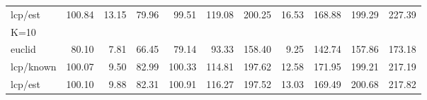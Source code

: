 \documentclass[12pt]{article}
\begin{document}
\begin{table}[ht]
{\begin{tabular}{l|rrrrr|rrrrr}
lcp/est  & 100.84 &13.15 &79.96  &99.51 &119.08  &200.25 &16.53 &168.88 &199.29 &227.39\\
K=10     &        &      &       &      &        &       &      &       &       &       \\
euclid   &  80.10 & 7.81 &66.45  &79.14 &93.33   &158.40 & 9.25 &142.74 &157.86 &173.18\\
lcp/known& 100.07 & 9.50 &82.99  &100.33&114.81  &197.62 &12.58 &171.95 &199.21 &217.19\\
lcp/est  & 100.10 & 9.88 &82.31  &100.91&116.27  &197.52 &13.03 &169.49 &200.68 &217.82\\ \hline
\end{tabular}
}
\label{tab.results3}
\end{table}
\end{document}
